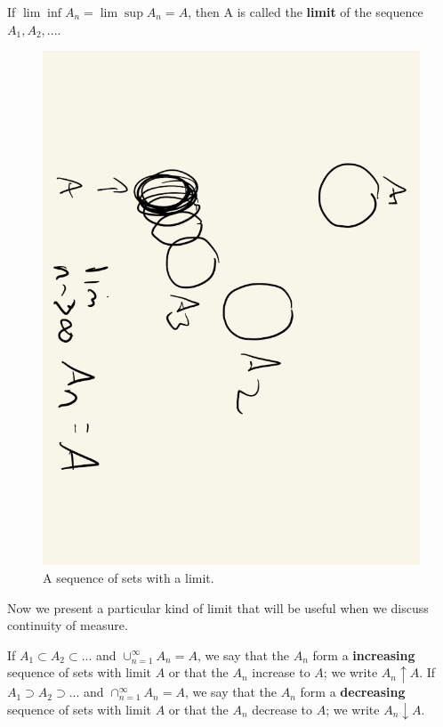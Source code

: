 \documentclass{article} %
\begin{document}

\begin{definition}
If $\lim\inf A_n = \lim\sup A_n = A$, then A is called the \textbf{limit} of the sequence $A_1, A_2, ...$. 
\end{definition}

\begin{figure}[H]
\centering 
\includegraphics[angle=90, width=.5\textwidth]{images/sequence_of_sets_with_limit}
\caption{A sequence of sets with a limit.}
\end{figure}

Now we present a particular kind of limit that will be useful when we discuss continuity of measure. 

\begin{definition}
If $A_1 \subset A_2 \subset ...$ and $\cup_{n=1}^\infty A_n = A$, we say that the $A_n$ form a \textbf{increasing} sequence of sets with limit $A$ or that the $A_n$ increase to $A$; we write $A_n \uparrow A$.  If $A_1 \supset A_2 \supset ... $ and  	$\cap_{n=1}^\infty A_n = A$, we say that the $A_n$ form a \textbf{decreasing} sequence of sets with limit $A$ or that the $A_n$ decrease to $A$; we write $A_n \downarrow A$.
\end{definition}
\end{document}
